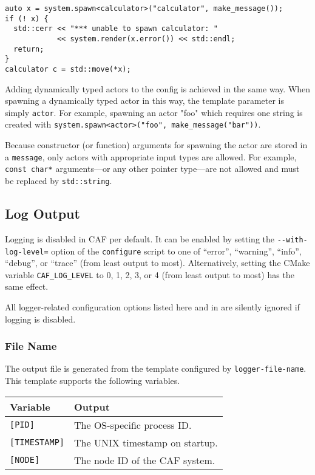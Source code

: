 \begin{lstlisting}
auto x = system.spawn<calculator>("calculator", make_message());
if (! x) {
  std::cerr << "*** unable to spawn calculator: "
            << system.render(x.error()) << std::endl;
  return;
}
calculator c = std::move(*x);
\end{lstlisting}

Adding dynamically typed actors to the config is achieved in the same way. When spawning a dynamically typed actor in this way, the template parameter is simply \lstinline^actor^. For example, spawning an actor "foo" which requires one string is created with \lstinline^system.spawn<actor>("foo", make_message("bar"))^.

Because constructor (or function) arguments for spawning the actor are stored in a \lstinline^message^, only actors with appropriate input types are allowed. For example, \lstinline^const char*^ arguments---or any other pointer type---are not allowed and must be replaced by \lstinline^std::string^.

\clearpage
\subsection{Log Output}
\label{log-output}

Logging is disabled in CAF per default.
It can be enabled by setting the \lstinline^--with-log-level=^ option of the \lstinline^configure^ script to one of ``error'', ``warning'', ``info'', ``debug'', or ``trace'' (from least output to most).
Alternatively, setting the CMake variable \lstinline^CAF_LOG_LEVEL^ to 0, 1, 2, 3, or 4 (from least output to most) has the same effect.

All logger-related configuration options listed here and in  are silently ignored if logging is disabled.

\subsubsection{File Name}
\label{log-output-file-name}

The output file is generated from the template configured by \lstinline^logger-file-name^. This template supports the following variables.

\begin{tabular}{|p{}|p{}|}
  \hline
  \textbf{Variable} & \textbf{Output} \\
  \hline
  \texttt{[PID]} & The OS-specific process ID. \\
  \hline
  \texttt{[TIMESTAMP]} & The UNIX timestamp on startup. \\
  \hline
  \texttt{[NODE]} & The node ID of the CAF system. \\
  \hline
\end{tabular}

